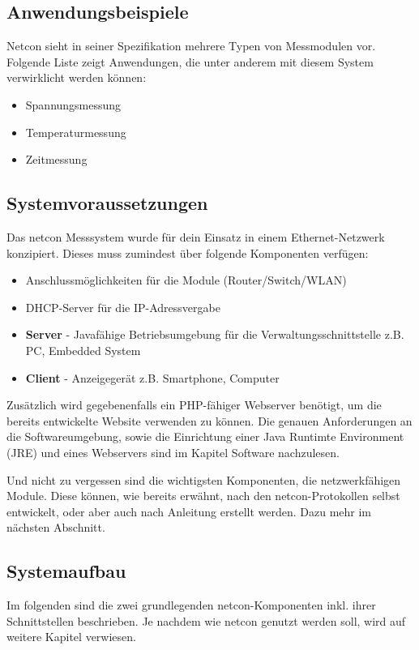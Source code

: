 \documentclass[a4paper,14pt,headsepline]{scrartcl}
\begin{document}
\subsection{Anwendungsbeispiele}
Netcon sieht in seiner Spezifikation mehrere Typen von Messmodulen vor. Folgende Liste zeigt Anwendungen, die unter anderem mit diesem System verwirklicht werden können:
\begin{itemize}
	\item Spannungsmessung
	\item Temperaturmessung
	\item Zeitmessung
\end{itemize}

\newpage

\subsection{Systemvoraussetzungen}

Das netcon Messsystem wurde für dein Einsatz in einem Ethernet-Netzwerk konzipiert. Dieses muss zumindest über folgende Komponenten verfügen:
\begin{itemize}
	\item Anschlussmöglichkeiten für die Module (Router/Switch/WLAN)
	\item DHCP-Server für die IP-Adressvergabe
	\item \textbf{Server} - Javafähige Betriebsumgebung für die Verwaltungsschnittstelle z.B. PC, Embedded System
	\item \textbf{Client} - Anzeigegerät z.B. Smartphone, Computer
\end{itemize}

Zusätzlich wird gegebenenfalls ein PHP-fähiger Webserver benötigt, um die bereits entwickelte Website verwenden zu können. Die genauen Anforderungen an die Softwareumgebung, sowie die Einrichtung einer Java Runtimte Environment (JRE) und eines Webservers sind im Kapitel Software nachzulesen.

Und nicht zu vergessen sind die wichtigsten Komponenten, die netzwerkfähigen Module. Diese können, wie bereits erwähnt, nach den netcon-Protokollen selbst entwickelt, oder aber auch nach Anleitung erstellt werden. Dazu mehr im nächsten Abschnitt.
\newpage

\subsection{Systemaufbau}
Im folgenden sind die zwei grundlegenden netcon-Komponenten inkl. ihrer Schnittstellen beschrieben. Je nachdem wie netcon genutzt werden soll, wird auf weitere Kapitel verwiesen.
\end{document}
